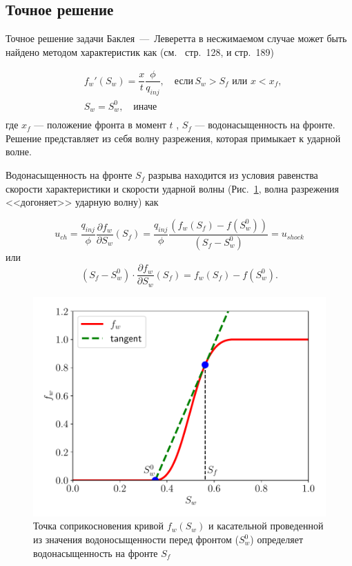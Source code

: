 \subsection{Точное решение }

Точное решение задачи Баклея~---~Леверетта в несжимаемом случае может быть найдено методом характеристик как (см.~\cite{Barenblatt_Entov_Ryzhik_1984} стр.~128, и \cite{Collins_1984} стр.~189)

\begin{equation}\label{exactSol_test}
	\begin{split}
		& f_w'(S_w) = \dfrac{x}{t} \dfrac{\phi}{q_{inj}}, \quad \text{если}\, S_w > S_f \text{ или } x < x_f, \\
		 & S_w=S_w^0, \quad \text{иначе} \\
	\end{split}
	\end{equation}
	где $x_f$ --- положение фронта в момент $t$ , $S_f$ --- водонасыщенность на фронте.
Решение представляет из себя волну разрежения, которая примыкает к ударной волне.

Водонасыщенность на фронте $S_f$ разрыва находится из условия равенства скорости характеристики и скорости ударной волны (Рис.~\ref{fig:FwCurveTangent}, волна разрежения <<догоняет>> ударную волну) как

\begin{equation}\label{eq:u_shock_ch}
	u_{ch} = \dfrac{q_{inj}}{\phi} \frac{\partial f_w}{\partial S_w}(S_f) = \dfrac{q_{inj}}{\phi} \dfrac{(f_w(S_f)-f(S_w^0))}{(S_f-S_w^0)} = u_{shock}
\end{equation}
или
\begin{equation}\label{eq:S_front_eq}
	(S_f-S_w^0)\cdot \frac{\partial f_w}{\partial S_w}(S_f)=f_w(S_f)-f(S_w^0).
\end{equation}
\begin{figure}[H]
	\centering
	\includegraphics[width=0.7\linewidth]{img/FwCurveTangent}
	\caption{Точка соприкосновения кривой $f_w(S_w)$ и касательной проведенной из значения водоносыщенности перед фронтом ($S_w^0$) определяет водонасыщенность на фронте $S_f$}
	\label{fig:FwCurveTangent}
\end{figure}

